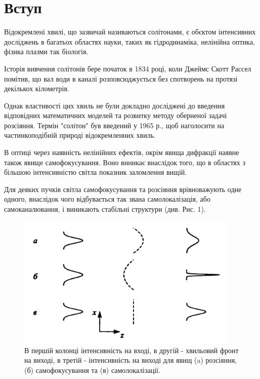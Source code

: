 \newpage
{}

\section{Вступ}




\hspace*{8mm} Відокремлені хвилі, що зазвичай називаються солітонами, є обєктом інтенсивних досліджень в багатьох областях науки, таких як гідродинаміка, нелінійна оптика, фізика плазми так біологія. 

Історія вивчення солітонів бере початок в 1834 році, коли Джеймс Скотт Рассел помітив, що вал води в каналі розповсюджується без спотворень на протязі декількох кілометрів.

Однак властивості цих хвиль не були докладно досліджені до введення відповідних математичних моделей та розвитку методу оберненої задачі розсіяння. Термін "солітон" був введений у 1965 р., щоб наголосити на частинкоподібній природі відокремленних хвиль. 

В оптиці через наявність нелінійних ефектів, окрім явища дифракції наявне також явище самофокусування. Воно виникає внаслідок того, що в областях з більшою інтенсивністю світла показник заломлення вищій. 

Для деяких пучків світла самофокусування та розсіяння врівноважують одне одного, внаслідок чого відбувається так звана самолокалізація, або самоканалювання, і виникають стабільні структури (див. Рис. 1).

\begin{figure}
  \centering
  \includegraphics[width=300pt]{fig1}
  \caption{В першій колонці інтенсивність на вході, в другій - хвильовий фронт на виході, в третій - інтенсивність на виході для явищ (a) розсіяння, (б) самофокусування та (в) самолокалізації. \label{fig1}}
\end{figure} 

